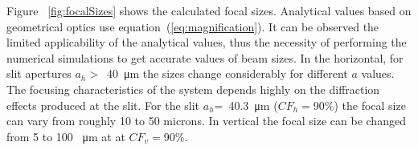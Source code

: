 \documentclass{iucr}              %
\newcommand{\todo}[1]{{\color{red}[TODO: "#1'']}}
\newcommand{\inblue}[1]{{\color{blue}#1}}
\newcommand{\inred}[1]{{\color{red}#1}}
\newcommand{\ingreen}[1]{{\color{green}#1}}
\begin{document}
Figure ~\ref{fig:focalSizes} shows the calculated focal sizes. Analytical values based on geometrical optics use  equation~(\ref{eq:magnification}). It can be observed the limited applicability of the analytical values, thus the necessity of performing the numerical simulations to get accurate values of beam sizes. In the horizontal, for slit apertures $a_h>$~\SI{40}{\micro\meter} the sizes change considerably for different $a$ values. The focusing characteristics of the system depends highly on the diffraction effects produced at the slit. For the slit $a_h$=~\SI{40.3}{\micro\meter} ($CF_h=$90\%) the focal size can vary from roughly 10 to 50 microns.  In vertical the focal size can be changed from 5 to 100 \SI{}{\micro\meter} at at $CF_v=$90\%.












\end{document}
